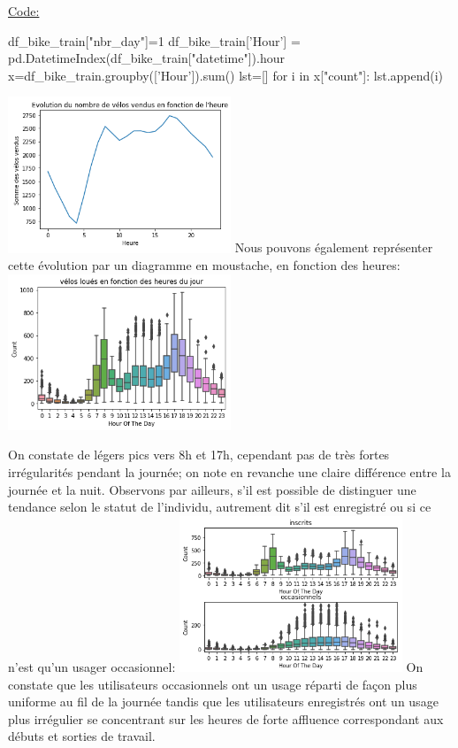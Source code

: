 \documentclass[a4paper,oneside,11pt]{article}
\begin{document}
\underline{Code:}
\begin{code-Python}
df_bike_train["nbr_day"]=1
df_bike_train['Hour'] = pd.DatetimeIndex(df_bike_train["datetime"]).hour
x=df_bike_train.groupby(['Hour']).sum()
lst=[]
for i in x["count"]:
    lst.append(i)
\end{code-Python}
\includegraphics[width=0.5\textwidth]{image_rapport/count_fct_heure}
\newline
Nous pouvons également représenter cette évolution par un diagramme en moustache, en fonction des heures: \newline
\includegraphics[width=0.5\textwidth]{image_rapport/moustache_count}

On constate de légers pics vers 8h et 17h, cependant pas de très fortes irrégularités pendant la journée; on note en revanche une claire différence entre la journée et la nuit. 
\newline
Observons par ailleurs, s'il est possible de distinguer une tendance selon le statut de l'individu, autrement dit s'il est enregistré ou si ce n'est qu'un usager occasionnel: \newline
\includegraphics[width=0.5\textwidth]{image_rapport/moustache_registercasual}
\newline
On constate que les utilisateurs occasionnels ont un usage réparti de façon plus uniforme au fil de la journée tandis que les utilisateurs enregistrés ont un usage plus irrégulier se concentrant sur les heures de forte affluence correspondant aux débuts et sorties de travail. \newline
\end{document}

